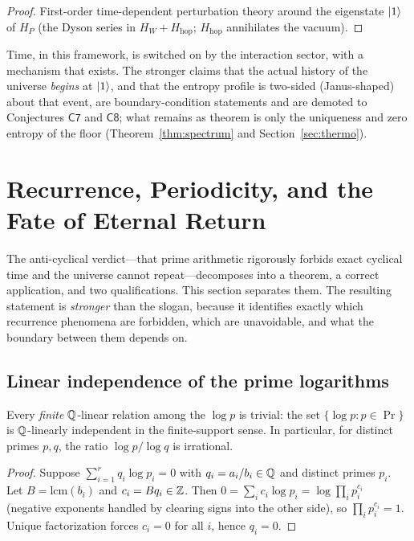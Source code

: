 \begin{proof}
First-order time-dependent perturbation theory around the eigenstate $\lvert 1\rangle$ of $H_{P}$
(the Dyson series in $H_{W}+H_{\mathrm{hop}}$; $H_{\mathrm{hop}}$ annihilates the vacuum).
\end{proof}

Time, in this framework, is switched on by the interaction sector, with a mechanism that
exists. The stronger claims that
the actual history of the universe \emph{begins} at $\lvert 1\rangle$, and that the entropy profile is
two-sided (Janus-shaped) about that event, are boundary-condition statements and are demoted
to Conjectures $\mathsf{C7}$ and $\mathsf{C8}$; what remains as theorem is only the
uniqueness and zero entropy of the floor (Theorem~\ref{thm:spectrum} and
Section~\ref{sec:thermo}).

\section{Recurrence, Periodicity, and the Fate of Eternal Return}\label{sec:recurrence}

The anti-cyclical verdict---that prime arithmetic rigorously forbids exact cyclical
time and the universe cannot repeat---decomposes into a theorem, a correct application,
and two qualifications. This section separates them. The
resulting statement is \emph{stronger} than the slogan, because it identifies
exactly which recurrence phenomena are forbidden, which are unavoidable, and what the
boundary between them depends on.

\subsection{Linear independence of the prime logarithms}

\begin{lemma}\label{lem:independence}
Every \emph{finite} $\mathbb{Q}$-linear relation among the $\log p$ is trivial: the set
$\{\log p:p\in\Pr\}$ is $\mathbb{Q}$-linearly independent in the finite-support sense. In
particular, for distinct primes
$p,q$, the ratio $\log p/\log q$ is irrational.
\end{lemma}

\begin{proof}
Suppose $\sum_{i=1}^{r}q_{i}\log p_{i}=0$ with $q_{i}=a_{i}/b_{i}\in\mathbb{Q}$ and distinct primes
$p_{i}$. Let $B=\mathrm{lcm}(b_{i})$ and $c_{i}=Bq_{i}\in\mathbb{Z}$. Then
$0=\sum_{i}c_{i}\log p_{i}=\log\prod_{i}p_{i}^{c_{i}}$ (negative exponents handled by clearing
signs into the other side), so $\prod_{i}p_{i}^{c_{i}}=1$. Unique factorization forces
$c_{i}=0$ for all $i$, hence $q_{i}=0$.
\end{proof}

